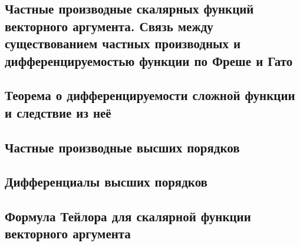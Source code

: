 \subsection{Частные производные скалярных функций векторного аргумента. Связь между существованием частных производных и дифференцируемостью функции по Фреше и Гато}
\subsection{Теорема о дифференцируемости сложной функции и следствие из неё}
\subsection{Частные производные высших порядков}
\subsection{Дифференциалы высших порядков}
\subsection{Формула Тейлора для скалярной функции векторного аргумента}

